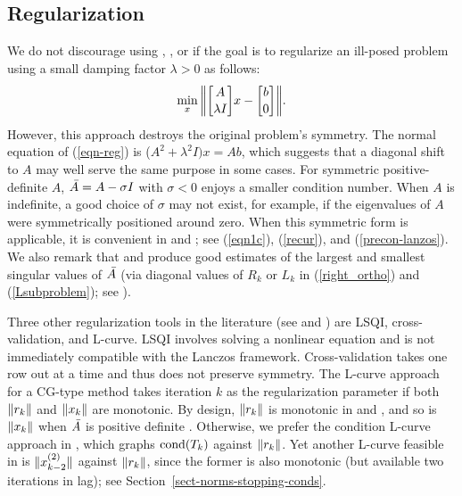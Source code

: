 \documentclass{doc_acmtrans2m}
\begin{document}
\subsection{Regularization}     
\label{sect-regularization}

We do not discourage using \CGLS, \LSQR, or \LSMR if the goal is to
regularize an ill-posed problem using a small damping factor $\lambda
> 0$ as follows:
\begin{equation} \min_x \,\normm{\bmat{A \\ \lambda I}x-\bmat{b\\0}}.
       \label{eqn-reg}
\end{equation}
However, this approach destroys the original problem's symmetry.  The
normal equation of (\ref{eqn-reg}) is ($A^2 + \lambda^2 I) x = Ab$,
which suggests that a diagonal shift to $A$ may well serve the same
purpose in some cases. For symmetric positive-definite $A$, $\Abar =
A-\sigma I$ with $\sigma < 0$ enjoys a smaller condition number.  When
$A$ is indefinite, a good choice of $\sigma$ may not exist, for
example, if the eigenvalues of $A$ were symmetrically positioned
around zero. When this symmetric form is applicable, it is convenient
in \MINRES and \MINRESQLP; see (\ref{eqn1c}), (\ref{recur}), and
(\ref{precon-lanzos}).  We also remark that \MINRES and \MINRESQLP
produce good estimates of the largest and smallest singular values of
$\Abar$ (via diagonal values of $R_k$ or $L_k$ in (\ref{right_ortho})
and (\ref{Lsubproblem}); see \cite[Section~4]{CPS11}).

Three other regularization tools in the literature (see
\cite[Sections~12.1.1-12.1.3]{GV} and \cite{H98}) are LSQI,
cross-validation, and L-curve. LSQI involves solving a nonlinear
equation and is not immediately compatible with the Lanczos
framework. Cross-validation takes one row out at a time and thus does
not preserve symmetry.  The L-curve approach for a CG-type method
takes iteration $k$ as the regularization parameter \cite[Chapter
  8]{H98} if both $\norm{r_k}$ and $\norm{x_k}$ are monotonic.  By
design, $\norm{r_k}$ is monotonic in \MINRES and \MINRESQLP, and so is
$\norm{x_k}$ when $\Abar$ is positive definite \cite{Fong2011}.
Otherwise, we prefer the condition L-curve approach in \cite{CLR00},
which graphs $\cond(T_k)$ against $\norm{r_k}$. Yet another L-curve
feasible in \MINRESQLP is $\norm{x_{k-2}^{(2)}}$ against $\norm{r_k}$,
since the former is also monotonic (but available two iterations in
lag); see Section~\ref{sect-norms-stopping-conds}.
 
\end{document}
